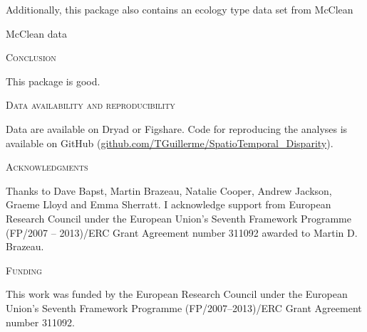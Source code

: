 \documentclass[12pt,letterpaper]{article}
\renewcommand{\section}[1]{%
\bigskip
\begin{center}
\begin{Large}
\normalfont\scshape #1
\medskip
\end{Large}
\end{center}}
\begin{document}
Additionally, this package also contains an ecology type data set from McClean

McClean data

\section{Conclusion}

This package is good.

\section{Data availability and reproducibility}
Data are available on Dryad or Figshare.
Code for reproducing the analyses is available on GitHub (\url{github.com/TGuillerme/SpatioTemporal_Disparity}).

\section{Acknowledgments}
Thanks to Dave Bapst, Martin Brazeau, Natalie Cooper, Andrew Jackson, Graeme Lloyd and Emma Sherratt.
I acknowledge support from European Research Council under the European Union's Seventh Framework Programme (FP/2007 – 2013)/ERC Grant Agreement number 311092 awarded to Martin D. Brazeau.

\section{Funding}
This work was funded by the European Research Council under the European Union's Seventh Framework Programme (FP/2007–2013)/ERC Grant Agreement number 311092.



\end{document}
